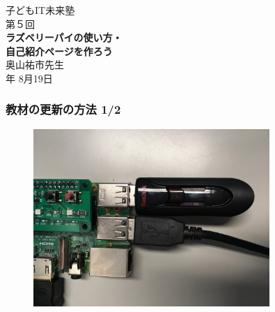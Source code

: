 \begin{frame}[fragile]
   \begin{center}
    \huge{子どもIT未来塾}\\

    \vspace{48pt}
	   \Large{第５回}\\
	   {\huge\bf ラズベリーパイの使い方・\\
	   \huge\bf 自己紹介ページを作ろう}\\
    \vspace{24pt}
    \large{奥山祐市先生}\\
    \vspace{10pt}
    \large{\the\year 年 8月19日}
  \end{center}
\end{frame}

\begin{frame}
    \frametitle{教材の更新の方法 1/2}
    \begin{center}
        \begin{figure}
            \includegraphics[width=0.8\textwidth]{images/slide/how_to_install_usb.png}
        \end{figure}
    \end{center}
\end{frame}

